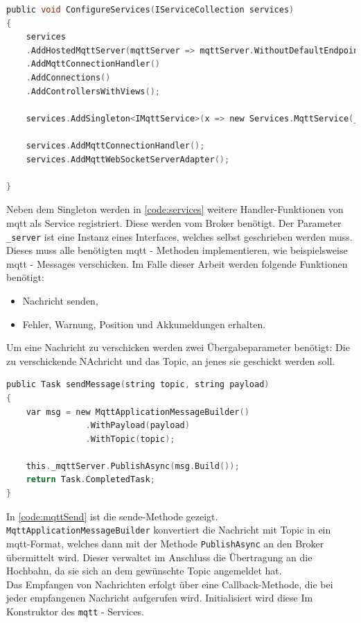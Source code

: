 \begin{lstlisting}[language=c, style=dhpaperdefault]
public void ConfigureServices(IServiceCollection services)
{
	services
	.AddHostedMqttServer(mqttServer => mqttServer.WithoutDefaultEndpoint())
	.AddMqttConnectionHandler()
	.AddConnections()
	.AddControllersWithViews();

	services.AddSingleton<IMqttService>(x => new Services.MqttService(_server));

	services.AddMqttConnectionHandler();
	services.AddMqttWebSocketServerAdapter();

}
\end{lstlisting}

Neben dem Singleton werden in \autoref{code:services} weitere Handler-Funktionen von \acrshort{mqtt} als Service registriert. Diese werden vom Broker benötigt. Der Parameter \texttt{\_server} ist eine Instanz eines Interfaces, welches selbst geschrieben werden muss. Dieses muss alle benötigten \acrshort{mqtt} - Methoden implementieren, wie beispielsweise \acrshort{mqtt} - Messages verschicken. Im Falle dieser Arbeit werden folgende Funktionen benötigt:

\begin{center}
	\begin{itemize}
		\item Nachricht senden,
		\item Fehler, Warnung, Position und Akkumeldungen erhalten.
	\end{itemize}
\end{center}

Um eine Nachricht zu verschicken werden zwei Übergabeparameter benötigt: Die zu verschickende NAchricht und das Topic, an jenes sie geschickt werden soll. 

\begin{lstlisting}[language=c, style=dhpaperdefault]
public Task sendMessage(string topic, string payload)
{
	var msg = new MqttApplicationMessageBuilder()
				.WithPayload(payload)
				.WithTopic(topic);

	this._mqttServer.PublishAsync(msg.Build());
	return Task.CompletedTask;
}
\end{lstlisting}

In \autoref{code:mqttSend} ist die sende-Methode gezeigt. \texttt{MqttApplicationMessageBuilder} konvertiert die Nachricht mit Topic in ein \acrshort{mqtt}-Format, welches dann mit der Methode \texttt{PublishAsync} an den Broker übermittelt wird. Dieser verwaltet im Anschluss die Übertragung an die Hochbahn, da sie sich an dem gewünschte Topic angemeldet hat.\\
Das Empfangen von Nachrichten erfolgt über eine Callback-Methode, die bei jeder empfangenen Nachricht aufgerufen wird. Initialisiert wird diese Im Konstruktor des \texttt{mqtt} - Services.

